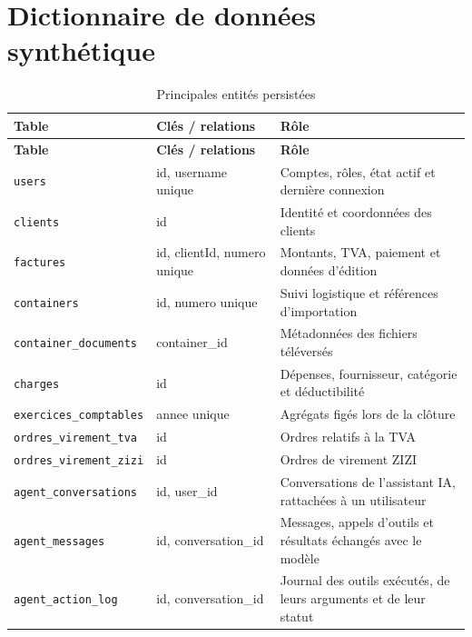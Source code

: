 \documentclass[12pt,a4paper,oneside]{report}
\newcommand{\code}[1]{\texttt{#1}}
\begin{document}
\section{Dictionnaire de données synthétique}
\begin{longtable}{p{3.5cm}p{4.5cm}p{6cm}}
\caption{Principales entités persistées}\\
\toprule \textbf{Table} & \textbf{Clés / relations} & \textbf{Rôle}\\ \midrule
\endfirsthead
\toprule \textbf{Table} & \textbf{Clés / relations} & \textbf{Rôle}\\ \midrule
\endhead
\code{users} & id, username unique & Comptes, rôles, état actif et dernière connexion\\
\code{clients} & id & Identité et coordonnées des clients\\
\code{factures} & id, clientId, numero unique & Montants, TVA, paiement et données d'édition\\
\code{containers} & id, numero unique & Suivi logistique et références d'importation\\
\code{container\_documents} & container\_id & Métadonnées des fichiers téléversés\\
\code{charges} & id & Dépenses, fournisseur, catégorie et déductibilité\\
\code{exercices\_comptables} & annee unique & Agrégats figés lors de la clôture\\
\code{ordres\_virement\_tva} & id & Ordres relatifs à la TVA\\
\code{ordres\_virement\_zizi} & id & Ordres de virement ZIZI\\
\code{agent\_conversations} & id, user\_id & Conversations de l'assistant IA, rattachées à un utilisateur\\
\code{agent\_messages} & id, conversation\_id & Messages, appels d'outils et résultats échangés avec le modèle\\
\code{agent\_action\_log} & id, conversation\_id & Journal des outils exécutés, de leurs arguments et de leur statut\\
\bottomrule
\end{longtable}
\end{document}
